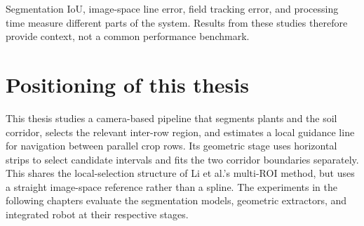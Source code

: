 Segmentation IoU, image-space line error, field tracking error, and
processing time measure different parts of the system. Results from
these studies therefore provide context, not a common performance
benchmark.

\section{Positioning of this thesis}
\label{sec:considerazioni_finali_stato_arte}

This thesis studies a camera-based pipeline that segments plants and
the soil corridor, selects the relevant inter-row region, and estimates
a local guidance line for navigation between parallel crop rows. Its
geometric stage uses horizontal strips to select candidate intervals
and fits the two corridor boundaries separately. This shares the
local-selection structure of Li et al.'s multi-ROI method, but uses a
straight image-space reference rather than a spline. The experiments
in the following chapters evaluate the segmentation models, geometric
extractors, and integrated robot at their respective stages.
